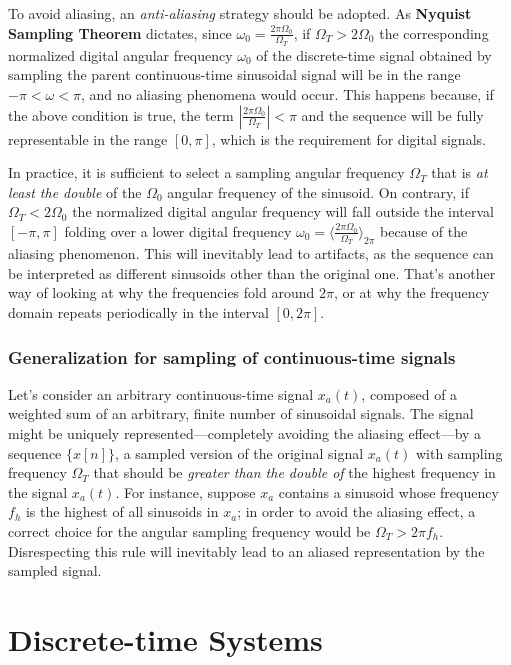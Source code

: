 \documentclass[\documentfontsize, twocolumn]{\classname}
\begin{document}
To avoid aliasing, an \emph{anti-aliasing} strategy should be adopted. As \textbf{Nyquist Sampling Theorem} dictates, since $\omega_0 = \frac{2\pi \Omega_0}{\Omega_T}$, if $\Omega_T > 2\Omega_0$ the corresponding normalized digital angular frequency $\omega_0$ of the discrete-time signal obtained by sampling the parent continuous-time sinusoidal signal will be in the range $-\pi < \omega < \pi$, and no aliasing phenomena would occur.
This happens because, if the above condition is true, the term $\left|\frac{2\pi \Omega_0}{\Omega_T}\right| < \pi$ and the sequence will be fully representable in the range $[0, \pi]$, which is the requirement for digital signals.

In practice, it is sufficient to select a sampling angular frequency $\Omega_T$ that is \emph{at least the double} of the $\Omega_0$ angular frequency of the sinusoid. On contrary, if $\Omega_T < 2\Omega_0$ the normalized digital angular frequency will fall outside the interval $[-\pi, \pi]$ folding over a lower digital frequency $\omega_0 = \langle \frac{2 \pi \Omega_0 }{\Omega_T}\rangle_{2\pi}$ because of the aliasing phenomenon. This will inevitably lead to artifacts, as the sequence can be interpreted as different sinusoids other than the original one.
That's another way of looking at why the frequencies fold around $2\pi$, or at why the frequency domain repeats periodically in the interval $[0, 2\pi]$.

\subsection{Generalization for sampling of continuous-time signals}

Let's consider an arbitrary continuous-time signal $x_a(t)$, composed of a weighted sum of an arbitrary, finite number of sinusoidal signals. The signal might be uniquely represented---completely avoiding the aliasing effect---by a sequence $\{x[n]\}$, a sampled version of the original signal $x_a(t)$ with sampling frequency $\Omega_T$ that should be \emph{greater than the double of} the highest frequency in the signal $x_a(t)$. For instance, suppose $x_a$ contains a sinusoid whose frequency $f_h$ is the highest of all sinusoids in $x_a$; in order to avoid the aliasing effect, a correct choice for the angular sampling frequency would be $\Omega_T > 2\pi f_h$. Disrespecting this rule will inevitably lead to an aliased representation by the sampled signal.


\chapter{Discrete-time Systems}
\end{document}

